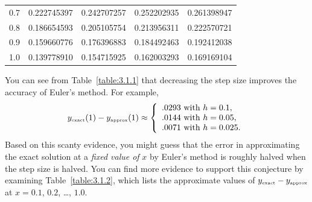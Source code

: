 \begin{examplesolution}
\begin{newtable}
\begin{center}
\begin{tabular}{|c|r|r|r|r|}
      0.7                       & 0.222745397                   & 0.242707257                    & 0.252202935                     & 0.261398947                 \\
      0.8                       & 0.186654593                   & 0.205105754                    & 0.213956311                     & 0.222570721                 \\
      0.9                       & 0.159660776                   & 0.176396883                    & 0.184492463                     & 0.192412038                 \\
      1.0                       & 0.139778910                   & 0.154715925                    & 0.162003293                     & 0.169169104                 \\
      \hline
    \end{tabular}
  \end{center}
\end{newtable}

You can see from Table~\ref{table:3.1.1} that decreasing the step size improves the accuracy of
Euler's method. For example,
\[
  y_{\mbox{\tiny exact}}(1)-y_{\mbox{\tiny approx}}(1)\approx \left\{
  \begin{array}{l}
    .0293\mbox{ with }h=0.1,   \\
    .0144\mbox{ with }h=0.05,  \\
    .0071\mbox{ with }h=0.025.
  \end{array}\right.
\]
Based on this scanty evidence, you might guess that the error in approximating the exact solution at
a {\color{blue}\it fixed value of\/} $x$ by Euler's method is roughly halved when the step size is
halved. You can find more evidence to support this conjecture by examining Table~\ref{table:3.1.2},
which lists the approximate values of $y_{\mbox{\tiny exact}}-y_{\mbox{\tiny approx}}$ at $x=0.1$,
$0.2$, \dots, $1.0$.


\end{examplesolution}
